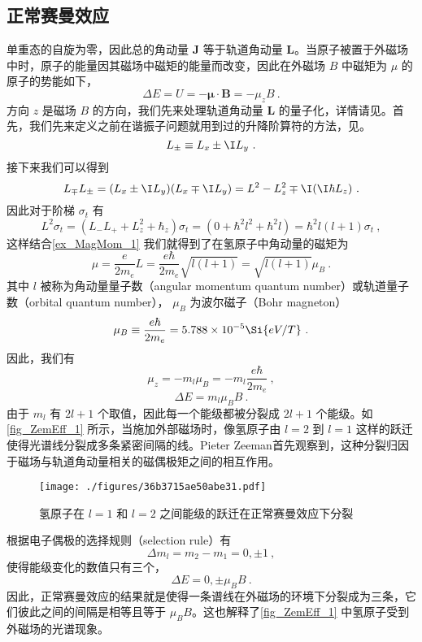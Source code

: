 \subsection{正常赛曼效应}
单重态的自旋为零，因此总的角动量 $\mathbf{J}$ 等于轨道角动量 $\mathbf{L}$。当原子被置于外磁场中时，原子的能量因其磁场中磁矩的能量而改变，因此在外磁场 $B$ 中磁矩为 $\mu$ 的原子的势能如下，
\begin{equation}
\Delta E=U = -\boldsymbol\mu\cdot \mathbf{B}=-\mu_z B~.
\end{equation}
方向 $z$ 是磁场 $B$ 的方向，我们先来处理轨道角动量 $\mathbf{L}$ 的量子化，详情请见。首先，我们先来定义之前在谐振子问题就用到过的升降阶算符的方法，见。
\begin{equation}
L_{\pm}\equiv L_x \pm \I L_y~.
\end{equation}
接下来我们可以得到
\begin{equation}
L_{\mp}L_{\pm}=(L_x \pm \I L_y)(L_x \mp \I L_y)=L^2-L_z^2\mp \I(\I\hbar L_z)~.
\end{equation}
因此对于阶梯 $\sigma_t$ 有
\begin{equation}
L^2\sigma_t=(L_{-}L_{+}+L^2_z+\hbar_z)\sigma_t=(0+\hbar^2l^2+\hbar^2l)=\hbar^2l(l+1)\sigma_t~,
\end{equation}
这样结合\autoref{ex_MagMom_1} 我们就得到了在氢原子中角动量的磁矩为
$$
\mu=\frac{e}{2m_e}L=\frac{e\hbar}{2m_e}\sqrt{l(l+1)}=\sqrt{l(l+1)}\mu_B~.
$$
其中 $l$ 被称为角动量量子数（angular momentum quantum number）或轨道量子数（orbital quantum number）， $\mu_B$ 为波尔磁子（Bohr magneton）
\begin{equation}
\mu_B\equiv\frac{e\hbar}{2m_e}=5.788\times 10^{-5}\Si{eV/T}~.
\end{equation}
因此，我们有
$$
\mu_z=-m_l\mu_B=-m_l\frac{e\hbar}{2m_e}~,
$$
\begin{equation}
\Delta E = m_l\mu_B B~.
\end{equation}
由于 $m_l$ 有 $2l+1$ 个取值，因此每一个能级都被分裂成 $2l+1$ 个能级。如\autoref{fig_ZemEff_1} 所示，当施加外部磁场时，像氢原子由 $l=2$ 到 $l=1$ 这样的跃迁使得光谱线分裂成多条紧密间隔的线。Pieter Zeeman首先观察到，这种分裂归因于磁场与轨道角动量相关的磁偶极矩之间的相互作用。
\begin{figure}[ht]
\centering
\texttt{[image: ./figures/36b3715ae50abe31.pdf]}
\caption{氢原子在 $l=1$ 和 $l=2$ 之间能级的跃迁在正常赛曼效应下分裂} \label{fig_ZemEff_1}
\end{figure}
根据电子偶极的选择规则（selection rule）有
$$
\Delta m_l = m_2-m_1=0, \pm 1~,
$$
使得能级变化的数值只有三个，
$$
\Delta E = 0,\pm \mu_B B~.
$$
因此，正常赛曼效应的结果就是使得一条谱线在外磁场的环境下分裂成为三条，它们彼此之间的间隔是相等且等于 $\mu_B B$。这也解释了\autoref{fig_ZemEff_1} 中氢原子受到外磁场的光谱现象。
